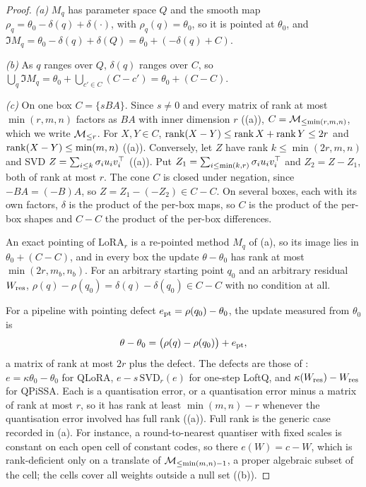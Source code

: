 \begin{proof}
\emph{(a)} $M_q$ has parameter space $Q$ and the smooth map $\rho_q=\theta_0-\delta(q)+\delta(\cdot)$, with
$\rho_q(q)=\theta_0$, so it is pointed at $\theta_0$, and $\Im M_q=\theta_0-\delta(q)+\delta(Q)=\theta_0+(-\delta(q)+C)$.

\emph{(b)} As $q$ ranges over $Q$, $\delta(q)$ ranges over $C$, so
$\bigcup_q\Im M_q=\theta_0+\bigcup_{c'\in C}(C-c')=\theta_0+(C-C)$.

\emph{(c)} On one box $C=\{sBA\}$. Since $s\ne0$ and every matrix of rank at most $\min(r,m,n)$ factors as $BA$ with inner
dimension $r$ ((a)), $C=\mathcal{M}_{\le\min(r,m,n)}$, which we write $\mathcal{M}_{\le r}$. For $X,Y\in C$,
$\operatorname{rank}(X-Y)\le\operatorname{rank} X+\operatorname{rank} Y\le2r$ and $\operatorname{rank}(X-Y)\le\min(m,n)$ ((a)). Conversely, let $Z$ have rank
$k\le\min(2r,m,n)$ and SVD $Z=\sum_{i\le k}\sigma_iu_iv_i^{\top}$ ((a)). Put $Z_1=\sum_{i\le\min(k,r)}\sigma_iu_iv_i^{\top}$
and $Z_2=Z-Z_1$, both of rank at most $r$. The cone $C$ is closed under negation, since $-BA=(-B)A$, so
$Z=Z_1-(-Z_2)\in C-C$. On several boxes, each with its own factors, $\delta$ is the product of the per-box maps, so $C$ is
the product of the per-box shapes and $C-C$ the product of the per-box differences.

An exact pointing of $\mathrm{LoRA}_r$ is a re-pointed method $M_q$ of (a), so its image lies in $\theta_0+(C-C)$, and in
every box the update $\theta-\theta_0$ has rank at most $\min(2r,m_b,n_b)$. For an arbitrary starting point $q_0$ and an
arbitrary residual $W_{\rm res}$, $\rho(q)-\rho(q_0)=\delta(q)-\delta(q_0)\in C-C$ with no condition at all.

For a pipeline with pointing defect $e_{\rm pt}=\rho(q_0)-\theta_0$, the update measured from $\theta_0$ is
\begin{equation*}
  \theta-\theta_0=\big(\rho(q)-\rho(q_0)\big)+e_{\rm pt},
\end{equation*}
a matrix of rank at most $2r$ plus the defect. The defects are those of : $e=\kappa\theta_0-
\theta_0$ for QLoRA, $e-s\,\mathrm{SVD}_r(e)$ for one-step LoftQ, and $\kappa(W_{\rm res})-W_{\rm res}$ for QPiSSA. Each is
a quantisation error, or a quantisation error minus a matrix of rank at most $r$, so it has rank at least $\min(m,n)-r$
whenever the quantisation error involved has full rank ((a)). Full rank is the generic case recorded in
(a). For instance, a round-to-nearest quantiser with fixed scales is constant on each open cell of
constant codes, so there $e(W)=c-W$, which is rank-deficient only on a translate of $\mathcal{M}_{\le\min(m,n)-1}$, a proper
algebraic subset of the cell; the cells cover all weights outside a null set ((b)).


\end{proof}
